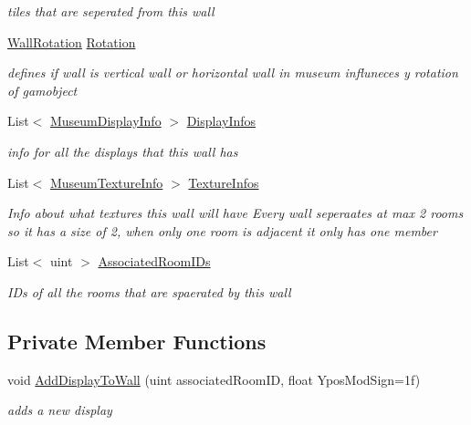\begin{DoxyCompactItemize}
\begin{DoxyCompactList}\small\item\em tiles that are seperated from this wall \end{DoxyCompactList}\item 
\mbox{\hyperlink{class_wall_a0ff16a0e73bfc8f0d89c5fd6849e3a97}{Wall\+Rotation}} \mbox{\hyperlink{class_wall_aa2d6c86c7ccabbb5e317b9ccac62e99e}{Rotation}}
\begin{DoxyCompactList}\small\item\em defines if wall is vertical wall or horizontal wall in museum influneces y rotation of gamobject \end{DoxyCompactList}\item 
List$<$ \mbox{\hyperlink{class_museum_display_info}{Museum\+Display\+Info}} $>$ \mbox{\hyperlink{class_wall_a5fc68c5010cd944a5103f84a749e87f7}{Display\+Infos}}
\begin{DoxyCompactList}\small\item\em info for all the displays that this wall has \end{DoxyCompactList}\item 
List$<$ \mbox{\hyperlink{class_museum_texture_info}{Museum\+Texture\+Info}} $>$ \mbox{\hyperlink{class_wall_adc37331462fd06077dbef80e89f5be89}{Texture\+Infos}}
\begin{DoxyCompactList}\small\item\em Info about what textures this wall will have Every wall seperaates at max 2 rooms so it has a size of 2, when only one room is adjacent it only has one member \end{DoxyCompactList}\item 
List$<$ uint $>$ \mbox{\hyperlink{class_wall_aa49042aeda37b3ad734a101f1df834eb}{Associated\+Room\+I\+Ds}}
\begin{DoxyCompactList}\small\item\em I\+Ds of all the rooms that are spaerated by this wall \end{DoxyCompactList}\end{DoxyCompactItemize}
\subsection*{Private Member Functions}
\begin{DoxyCompactItemize}
\item 
void \mbox{\hyperlink{class_wall_a2c2ccc6de461b4979816536859ef591c}{Add\+Display\+To\+Wall}} (uint associated\+Room\+ID, float Ypos\+Mod\+Sign=1f)
\begin{DoxyCompactList}\small\item\em adds a new display \end{DoxyCompactList}\end{DoxyCompactItemize}
